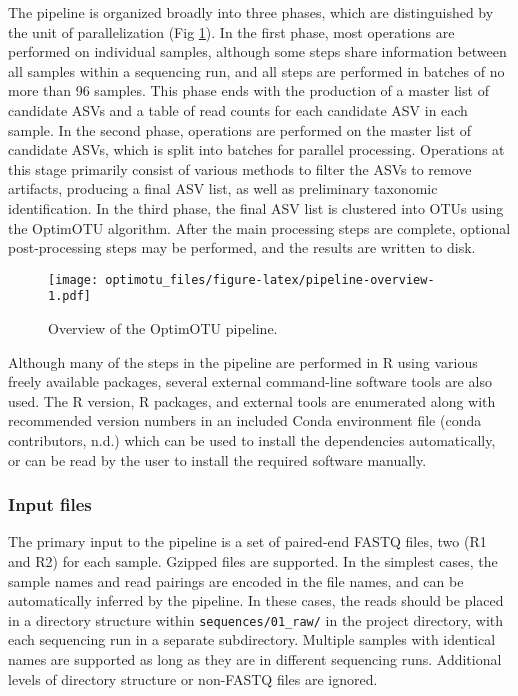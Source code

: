 \documentclass[
]{article}
\begin{document}
The pipeline is organized broadly into three phases, which are distinguished by the unit of parallelization (Fig \ref{fig:pipeline-overview}).
In the first phase, most operations are performed on individual samples, although some steps share information between all samples within a sequencing run, and all steps are performed in batches of no more than 96 samples.
This phase ends with the production of a master list of candidate ASVs and a table of read counts for each candidate ASV in each sample.
In the second phase, operations are performed on the master list of candidate ASVs, which is split into batches for parallel processing.
Operations at this stage primarily consist of various methods to filter the ASVs to remove artifacts, producing a final ASV list, as well as preliminary taxonomic identification.
In the third phase, the final ASV list is clustered into OTUs using the OptimOTU algorithm.
After the main processing steps are complete, optional post-processing steps may be performed, and the results are written to disk.

\begin{figure}
\centering
\texttt{[image: optimotu\_files/figure-latex/pipeline-overview-1.pdf]}
\caption{\label{fig:pipeline-overview}Overview of the OptimOTU pipeline.}
\end{figure}

Although many of the steps in the pipeline are performed in R using various freely available packages, several external command-line software tools are also used.
The R version, R packages, and external tools are enumerated along with recommended version numbers in an included Conda environment file (conda contributors, n.d.) which can be used to install the dependencies automatically, or can be read by the user to install the required software manually.

\subsubsection{Input files}\label{input-files}

The primary input to the pipeline is a set of paired-end FASTQ files, two (R1 and R2) for each sample.
Gzipped files are supported.
In the simplest cases, the sample names and read pairings are encoded in the file names, and can be automatically inferred by the pipeline.
In these cases, the reads should be placed in a directory structure within \texttt{sequences/01\_raw/} in the project directory, with each sequencing run in a separate subdirectory.
Multiple samples with identical names are supported as long as they are in different sequencing runs.
Additional levels of directory structure or non-FASTQ files are ignored.
\end{document}
